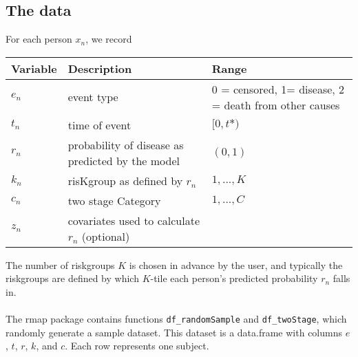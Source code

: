 \documentclass[11pt]{article}
\begin{document}
\subsection{The data}

For each person $x_n$, we record


\begin{center}
\begin{tabular}{|l|l|p{3in}|}
\hline
{\bf Variable} & {\bf Description} & {\bf Range} \\
\hline
$e_n$ & event type & 0 = censored, 1= disease, 2 = death from other
causes \\
$t_n$ & time of event & $[0, t*)$ \\
$r_n$ & probability of disease as predicted by the model & $(0, 1)$ \\
$k_n$ & risKgroup as defined by $r_n$ & $1, ..., K$ \\
$c_n$ & two stage Category & $1, ..., C$ \\
$z_n$ & covariates used to calculate $r_n$ (optional) & \\
\hline
\end{tabular}
\end{center}


The number of riskgroups $K$ is chosen in advance by the user, and typically the
riskgroups are defined by which $K$-tile each person's predicted
probability $r_n$ falls in. \\ 
\\
The rmap package contains functions \texttt{df\_randomSample} and
\texttt{df\_twoStage}, which randomly generate a sample dataset.  
This dataset is a data.frame with columns $e$, $t$, $r$, $k$, and
$c$. Each row represents one subject.
\end{document}
